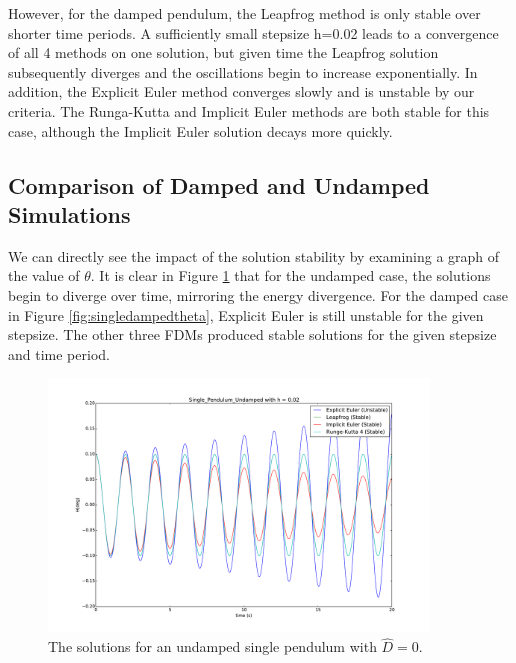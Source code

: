 \documentclass{article}
\begin{document}
However, for the damped pendulum, the Leapfrog method is only stable over shorter time periods. A sufficiently small stepsize h=0.02 leads to a convergence of all 4 methods on one solution, but given time the Leapfrog solution subsequently diverges and the oscillations begin to increase exponentially. In addition, the Explicit Euler method converges slowly and is unstable by our criteria. The Runga-Kutta and Implicit Euler methods are both stable for this case, although the Implicit Euler solution decays more quickly.

\subsection{Comparison of Damped and Undamped Simulations}
We can directly see the impact of the solution stability by examining a graph of the value of $\theta$. It is clear in Figure \ref{fig:singleundampedtheta} that for the undamped case, the solutions begin to diverge over time, mirroring the energy divergence. For the damped case in Figure \ref{fig:singledampedtheta}, Explicit Euler is still unstable for the given stepsize. The other three FDMs produced stable solutions for the given stepsize and time period.

\begin{figure}
\begin{center}
\includegraphics[width=0.9\textwidth]{Single_Pendulum_Undamped_Theta}
\caption{The solutions for an undamped single pendulum with $\hat{D}=0$. }
\label{fig:singleundampedtheta}
\end{center}
\end{figure}
\end{document}
